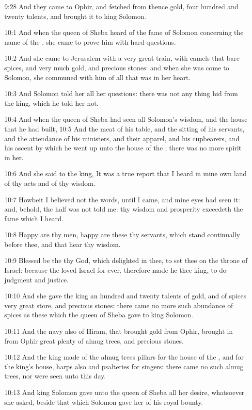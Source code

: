 9:28 And they came to Ophir, and fetched from thence gold, four
hundred and twenty talents, and brought it to king Solomon.

10:1 And when the queen of Sheba heard of the fame of Solomon
concerning the name of the \LORD, she came to prove him with hard
questions.

10:2 And she came to Jerusalem with a very great train, with camels
that bare spices, and very much gold, and precious stones: and when
she was come to Solomon, she communed with him of all that was in her
heart.

10:3 And Solomon told her all her questions: there was not any thing
hid from the king, which he told her not.

10:4 And when the queen of Sheba had seen all Solomon's wisdom, and
the house that he had built, 10:5 And the meat of his table, and the
sitting of his servants, and the attendance of his ministers, and
their apparel, and his cupbearers, and his ascent by which he went up
unto the house of the \LORD; there was no more spirit in her.

10:6 And she said to the king, It was a true report that I heard in
mine own land of thy acts and of thy wisdom.

10:7 Howbeit I believed not the words, until I came, and mine eyes had
seen it: and, behold, the half was not told me: thy wisdom and
prosperity exceedeth the fame which I heard.

10:8 Happy are thy men, happy are these thy servants, which stand
continually before thee, and that hear thy wisdom.

10:9 Blessed be the \LORD thy God, which delighted in thee, to set thee
on the throne of Israel: because the \LORD loved Israel for ever,
therefore made he thee king, to do judgment and justice.

10:10 And she gave the king an hundred and twenty talents of gold, and
of spices very great store, and precious stones: there came no more
such abundance of spices as these which the queen of Sheba gave to
king Solomon.

10:11 And the navy also of Hiram, that brought gold from Ophir,
brought in from Ophir great plenty of almug trees, and precious
stones.

10:12 And the king made of the almug trees pillars for the house of
the \LORD, and for the king's house, harps also and psalteries for
singers: there came no such almug trees, nor were seen unto this day.

10:13 And king Solomon gave unto the queen of Sheba all her desire,
whatsoever she asked, beside that which Solomon gave her of his royal
bounty.

